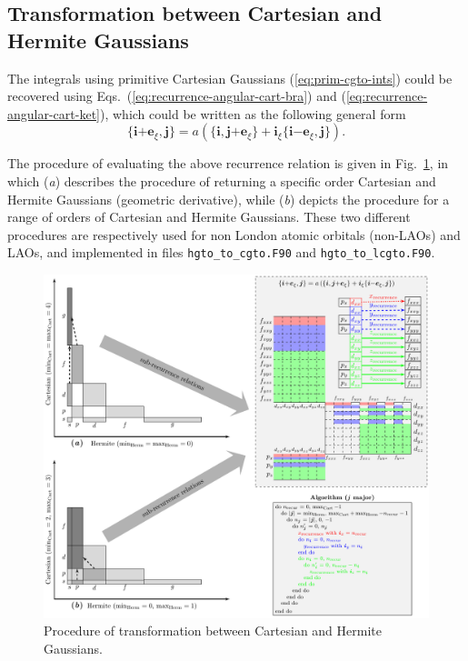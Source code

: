 \documentclass[a4paper,11pt,twoside,openright]{book}
\begin{document}
\subsection{Transformation between Cartesian and Hermite Gaussians}
\label{subsec:hgto-to-cgto}

The integrals using primitive Cartesian Gaussians (\ref{eq:prim-cgto-ints}) could be
recovered using Eqs.~(\ref{eq:recurrence-angular-cart-bra}) and (\ref{eq:recurrence-angular-cart-ket}),
which could be written as the following general form
\begin{equation}
 \{\boldsymbol{i}\mathrm{+}\boldsymbol{e}_{\xi},\boldsymbol{j}\}%
   =a\left(\{\boldsymbol{i},\boldsymbol{j}\mathrm{+}\boldsymbol{e}_{\xi}\}%
    +\boldsymbol{i}_{\xi}\{\boldsymbol{i}\mathrm{-}\boldsymbol{e}_{\xi},\boldsymbol{j}\}\right).
\end{equation}

The procedure of evaluating the above recurrence relation is given in Fig.~\ref{fig:hgto-to-cgto}, in which
(\textit{a}) describes the procedure of returning a specific order Cartesian and Hermite Gaussians (geometric
derivative), while (\textit{b}) depicts the procedure for a range of orders of Cartesian and Hermite Gaussians.
These two different procedures are respectively used for non London atomic orbitals (non-LAOs) and LAOs,
and implemented in files \verb|hgto_to_cgto.F90| and \verb|hgto_to_lcgto.F90|.
\begin{figure}[hbtp]
  \centering
  \includegraphics[width=6.8in]{hgto_to_cgto.pdf}
  \caption{Procedure of transformation between Cartesian and Hermite Gaussians.}
  \label{fig:hgto-to-cgto}
\end{figure}
\end{document}
